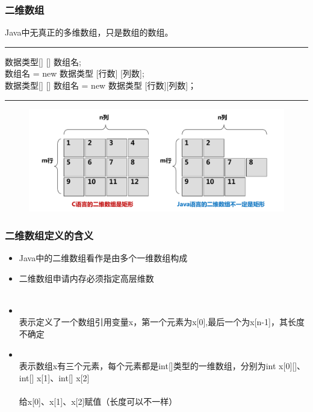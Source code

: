 \begin{frame}[fragile]
  \frametitle{二维数组}

  Java中无真正的多维数组，只是数组的数组。


  \rule[0pt]{10cm}{0.05em}

  {\kai 数据类型[] [] 数组名;\\
  数组名 = new 数据类型 [行数] [列数];\\
  数据类型[] [] 数组名 = new 数据类型 [行数][列数]；
  }
  
  \rule[0pt]{10cm}{0.05em}

  \begin{figure}
    \centering
    \includegraphics[width=.8\textwidth]{ppt/2-dim-array.pdf}
  \end{figure}
\end{frame}

\begin{frame}[fragile]
  \frametitle{二维数组定义的含义}
  \begin{itemize}[<+-| structure@+>]
  \item Java中的二维数组看作是由多个一维数组构成
  \item 二维数组申请内存必须指定{\Red 高层维数}\\
    \\
  \item {}\\
    {\kai\Blue 表示定义了一个数组引用变量x，第一个元素为x[0],最后一个为x[n-1]，其长度不确定}
  \item {}\\
    {\kai\Blue 表示数组x有三个元素，每个元素都是int[]类型的一维数组，分别为int x[0][]、int[] x[1]、int[] x[2]}\\
    \\
    {\kai\Blue 给x[0]、x[1]、x[2]赋值（长度可以不一样）}
  \end{itemize}
\end{frame}

